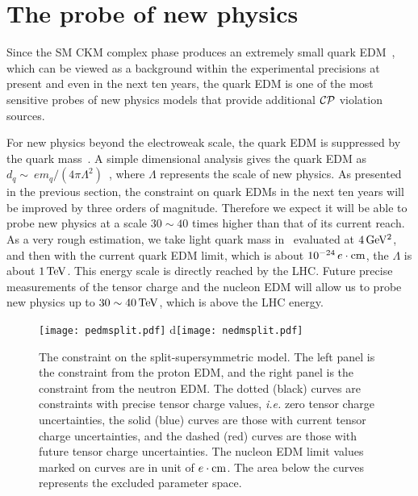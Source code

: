 \documentclass[aps,prd,twocolumn,groupedaddress,showpacs,superscriptaddress,floatfix,nofootinbib,10pt]{revtex4-1}
\begin{document}
\section{The probe of new physics}

Since the SM CKM complex phase produces an extremely small quark EDM~\cite{Czarnecki:1997bu}, which can be viewed as a background within the experimental precisions at present and even in the next ten years, the quark EDM is one of the most sensitive probes of new physics models that provide additional $\cal CP$ violation sources. 

For new physics beyond the electroweak scale, the quark EDM is suppressed by the quark mass~\cite{Grzadkowski:2010es,DeRujula:1990db}. A simple dimensional analysis gives the quark EDM as $d_q\sim~e m_q/(4\pi\Lambda^2)$~\cite{Pospelov:2005pr}, where $\Lambda$ represents the scale of new physics. As presented in the previous section, the constraint on quark EDMs in the next ten years will be improved by three orders of magnitude. Therefore we expect it will be able to probe new physics at a scale $30\sim40$ times higher than that of its current reach. As a very rough estimation, we take light quark mass in~\cite{Olive:2016xmw} evaluated at $4\,\rm GeV^2$, and then  with the current quark EDM limit, which is about $10^{-24}\,e\cdot{\rm cm}$, the $\Lambda$ is about $1\,\rm TeV$. This energy scale is directly reached by the LHC. Future precise measurements of the tensor charge and the nucleon EDM will allow us to probe new physics up to $30\sim40\,\rm TeV$, which is above the LHC energy.

\begin{figure*}
\texttt{[image: pedmsplit.pdf]}
d\texttt{[image: nedmsplit.pdf]}
\caption{The constraint on the split-supersymmetric model. The left panel is the constraint from the proton EDM, and the right panel is the constraint from the neutron EDM. The dotted (black) curves are constraints with precise tensor charge values, {\it i.e.} zero tensor charge uncertainties, the solid (blue) curves are those with current tensor charge uncertainties, and the dashed (red) curves are those with future tensor charge uncertainties. The nucleon EDM limit values marked on curves are in unit of $e\cdot{\rm cm}$. The area below the curves represents the excluded parameter space.}\label{split_susy}
\end{figure*}
\end{document}
